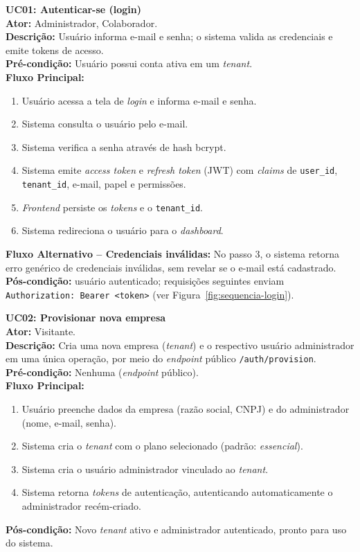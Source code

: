 \medskip
\noindent\textbf{UC01: Autenticar-se (login)}\\
\textbf{Ator:} Administrador, Colaborador.\\
\textbf{Descrição:} Usuário informa e-mail e senha; o sistema valida as credenciais e emite tokens de acesso.\\
\textbf{Pré-condição:} Usuário possui conta ativa em um \textit{tenant}.\\
\textbf{Fluxo Principal:}
\begin{enumerate}
  \item Usuário acessa a tela de \textit{login} e informa e-mail e senha.
  \item Sistema consulta o usuário pelo e-mail.
  \item Sistema verifica a senha através de hash bcrypt.
  \item Sistema emite \textit{access token} e \textit{refresh token} (JWT) com \textit{claims} de \texttt{user\_id}, \texttt{tenant\_id}, e-mail, papel e permissões.
  \item \textit{Frontend} persiste os \textit{tokens} e o \texttt{tenant\_id}.
  \item Sistema redireciona o usuário para o \textit{dashboard}.
\end{enumerate}
\textbf{Fluxo Alternativo -- Credenciais inválidas:} No passo 3, o sistema retorna erro genérico de credenciais inválidas, sem revelar se o e-mail está cadastrado.\\
\textbf{Pós-condição:} usuário autenticado; requisições seguintes enviam \texttt{Authorization: Bearer <token>} (ver Figura~\ref{fig:sequencia-login}).

\medskip
\noindent\textbf{UC02: Provisionar nova empresa}\\
\textbf{Ator:} Visitante.\\
\textbf{Descrição:} Cria uma nova empresa (\textit{tenant}) e o respectivo usuário administrador em uma única operação, por meio do \textit{endpoint} público \texttt{/auth/provision}.\\
\textbf{Pré-condição:} Nenhuma (\textit{endpoint} público).\\
\textbf{Fluxo Principal:}
\begin{enumerate}
  \item Usuário preenche dados da empresa (razão social, CNPJ) e do administrador (nome, e-mail, senha).
  \item Sistema cria o \textit{tenant} com o plano selecionado (padrão: \textit{essencial}).
  \item Sistema cria o usuário administrador vinculado ao \textit{tenant}.
  \item Sistema retorna \textit{tokens} de autenticação, autenticando automaticamente o administrador recém-criado.
\end{enumerate}
\textbf{Pós-condição:} Novo \textit{tenant} ativo e administrador autenticado, pronto para uso do sistema.

